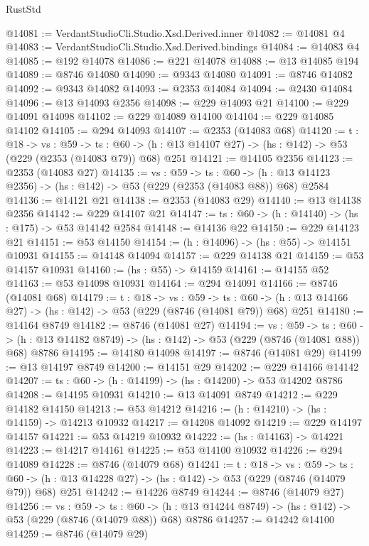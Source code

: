 \begin{lexlean}{RustStd}
\begin{coremodule}
@14081 := VerdantStudioCli.Studio.Xsd.Derived.inner
@14082 := @14081 @4
@14083 := VerdantStudioCli.Studio.Xsd.Derived.bindings
@14084 := @14083 @4
@14085 := @192 @14078
@14086 := @221 @14078
@14088 := @13 @14085 @194
@14089 := @8746 @14080
@14090 := @9343 @14080
@14091 := @8746 @14082
@14092 := @9343 @14082
@14093 := @2353 @14084
@14094 := @2430 @14084
@14096 := @13 @14093 @2356
@14098 := @229 @14093 @21
@14100 := @229 @14091 @14098
@14102 := @229 @14089 @14100
@14104 := @229 @14085 @14102
@14105 := @294 @14093
@14107 := @2353 (@14083 @68)
@14120 := {t : @18} ->
  {vs : @59} ->
  {ts : @60} -> (h : @13 @14107 @27) -> (hs : @142) -> @53 (@229 (@2353 (@14083 @79)) @68) @251
@14121 := @14105 @2356
@14123 := @2353 (@14083 @27)
@14135 := {vs : @59} ->
  {ts : @60} -> (h : @13 @14123 @2356) -> (hs : @142) -> @53 (@229 (@2353 (@14083 @88)) @68) @2584
@14136 := @14121 @21
@14138 := @2353 (@14083 @29)
@14140 := @13 @14138 @2356
@14142 := @229 @14107 @21
@14147 := {ts : @60} -> (h : @14140) -> (hs : @175) -> @53 @14142 @2584
@14148 := @14136 @22
@14150 := @229 @14123 @21
@14151 := @53 @14150
@14154 := (h : @14096) -> (hs : @55) -> @14151 @10931
@14155 := @14148 @14094
@14157 := @229 @14138 @21
@14159 := @53 @14157 @10931
@14160 := (hs : @55) -> @14159
@14161 := @14155 @52
@14163 := @53 @14098 @10931
@14164 := @294 @14091
@14166 := @8746 (@14081 @68)
@14179 := {t : @18} ->
  {vs : @59} ->
  {ts : @60} -> (h : @13 @14166 @27) -> (hs : @142) -> @53 (@229 (@8746 (@14081 @79)) @68) @251
@14180 := @14164 @8749
@14182 := @8746 (@14081 @27)
@14194 := {vs : @59} ->
  {ts : @60} -> (h : @13 @14182 @8749) -> (hs : @142) -> @53 (@229 (@8746 (@14081 @88)) @68) @8786
@14195 := @14180 @14098
@14197 := @8746 (@14081 @29)
@14199 := @13 @14197 @8749
@14200 := @14151 @29
@14202 := @229 @14166 @14142
@14207 := {ts : @60} -> (h : @14199) -> (hs : @14200) -> @53 @14202 @8786
@14208 := @14195 @10931
@14210 := @13 @14091 @8749
@14212 := @229 @14182 @14150
@14213 := @53 @14212
@14216 := (h : @14210) -> (hs : @14159) -> @14213 @10932
@14217 := @14208 @14092
@14219 := @229 @14197 @14157
@14221 := @53 @14219 @10932
@14222 := (hs : @14163) -> @14221
@14223 := @14217 @14161
@14225 := @53 @14100 @10932
@14226 := @294 @14089
@14228 := @8746 (@14079 @68)
@14241 := {t : @18} ->
  {vs : @59} ->
  {ts : @60} -> (h : @13 @14228 @27) -> (hs : @142) -> @53 (@229 (@8746 (@14079 @79)) @68) @251
@14242 := @14226 @8749
@14244 := @8746 (@14079 @27)
@14256 := {vs : @59} ->
  {ts : @60} -> (h : @13 @14244 @8749) -> (hs : @142) -> @53 (@229 (@8746 (@14079 @88)) @68) @8786
@14257 := @14242 @14100
@14259 := @8746 (@14079 @29)

\end{coremodule}
\end{lexlean}
